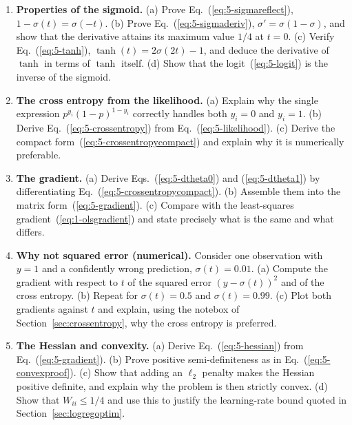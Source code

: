 \begin{enumerate}

\item \textbf{Properties of the sigmoid.}
  (a) Prove Eq.~(\ref{eq:5-sigmareflect}), $1-\sigma(t)=\sigma(-t)$.
  (b) Prove Eq.~(\ref{eq:5-sigmaderiv}),
      $\sigma'=\sigma(1-\sigma)$, and show that the derivative attains its
      maximum value $1/4$ at $t=0$.
  (c) Verify Eq.~(\ref{eq:5-tanh}), $\tanh(t)=2\sigma(2t)-1$, and deduce the
      derivative of $\tanh$ in terms of $\tanh$ itself.
  (d) Show that the logit~(\ref{eq:5-logit}) is the inverse of the sigmoid.

\item \textbf{The cross entropy from the likelihood.}
  (a) Explain why the single expression $p^{y_i}(1-p)^{1-y_i}$ correctly
      handles both $y_i=0$ and $y_i=1$.
  (b) Derive Eq.~(\ref{eq:5-crossentropy}) from
      Eq.~(\ref{eq:5-likelihood}).
  (c) Derive the compact form~(\ref{eq:5-crossentropycompact}) and explain why
      it is numerically preferable.

\item \textbf{The gradient.}
  (a) Derive Eqs.~(\ref{eq:5-dtheta0}) and (\ref{eq:5-dtheta1}) by
      differentiating Eq.~(\ref{eq:5-crossentropycompact}).
  (b) Assemble them into the matrix form~(\ref{eq:5-gradient}).
  (c) Compare with the least-squares gradient~(\ref{eq:1-olsgradient}) and
      state precisely what is the same and what differs.

\item \textbf{Why not squared error (numerical).}
  Consider one observation with $y=1$ and a confidently wrong prediction,
  $\sigma(t)=0.01$.
  (a) Compute the gradient with respect to $t$ of the squared error
      $(y-\sigma(t))^{2}$ and of the cross entropy.
  (b) Repeat for $\sigma(t)=0.5$ and $\sigma(t)=0.99$.
  (c) Plot both gradients against $t$ and explain, using the notebox of
      Section~\ref{sec:crossentropy}, why the cross entropy is preferred.

\item \textbf{The Hessian and convexity.}
  (a) Derive Eq.~(\ref{eq:5-hessian}) from Eq.~(\ref{eq:5-gradient}).
  (b) Prove positive semi-definiteness as in Eq.~(\ref{eq:5-convexproof}).
  (c) Show that adding an $\ell_2$ penalty makes the Hessian positive
      definite, and explain why the problem is then strictly convex.
  (d) Show that $W_{ii}\le 1/4$ and use this to justify the learning-rate
      bound quoted in Section~\ref{sec:logregoptim}.


\end{enumerate}
